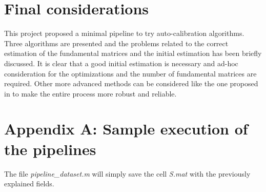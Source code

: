 \documentclass[11pt]{article}
\begin{document}
\section{Final considerations}
This project proposed a minimal pipeline to try auto-calibration algorithms. Three algorithms are presented and the problems related to the correct estimation of the fundamental matrices and the initial estimation has been briefly discussed. It is clear that a good initial estimation is necessary and ad-hoc consideration for the optimizations and the number of fundamental matrices are required. Other more advanced methods can be considered like the one proposed in \cite{Gherardi10} to make the entire process more robust and reliable. 

\section{Appendix A: Sample execution of the pipelines}
\noindent The file \textit{pipeline\_dataset.m} will simply save the cell \textit{S.mat} with the previously explained fields.
\end{document}
